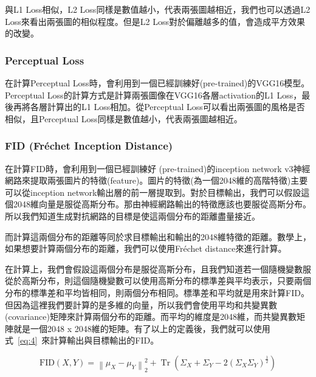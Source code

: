 \documentclass[a4paper, 12pt]{article}
\begin{document}
與L1 Loss相似，L2 Loss同樣是數值越小，代表兩張圖越相近，我們也可以透過L2 Loss來看出兩張圖的相似程度。但是L2 Loss對於偏離越多的值，會造成平方效果的改變。

\subsubsection{Perceptual Loss\cite{zhang2018perceptual}}

在計算Perceptual Loss時，會利用到一個已經訓練好(pre-trained)的VGG16模型。Perceptual Loss的計算方式是計算兩張圖像在VGG16各層activation的L1 Loss，最後再將各層計算出的L1 Loss相加。從Perceptual Loss可以看出兩張圖的風格是否相似，且Perceptual Loss同樣是數值越小，代表兩張圖越相近。

\subsubsection{FID (Fréchet Inception Distance)\cite{DOWSON1982450}}
在計算FID時，會利用到一個已經訓練好 (pre-trained)的inception network v3神經網路來提取兩張圖片的特徵(feature)。圖片的特徵(為一個2048維的高階特徵)主要可以從inception network輸出層的前一層提取到。對於目標輸出，我們可以假設這個2048維向量是服從高斯分布。那由神經網路輸出的特徵應該也要服從高斯分布。所以我們知道生成對抗網路的目標是使這兩個分布的距離盡量接近。

而計算這兩個分布的距離等同於求目標輸出和輸出的2048維特徵的距離。數學上，如果想要計算兩個分布的距離，我們可以使用Fréchet distance來進行計算。

在計算上，我們會假設這兩個分布是服從高斯分布，且我們知道若一個隨機變數服從於高斯分布，則這個隨機變數可以使用高斯分布的標準差與平均表示，只要兩個分布的標準差和平均皆相同，則兩個分布相同。標準差和平均就是用來計算FID。但因為這裡我們要計算的是多維的向量，所以我們會使用平均和共變異數(covariance)矩陣來計算兩個分布的距離。而平均的維度是2048維，而共變異數矩陣就是一個2048 x 2048維的矩陣。有了以上的定義後，我們就可以使用式~\ref{eq:4}~來計算輸出與目標輸出的FID。

\begin{equation}
\mathrm{FID}(X, Y)=\left\|\mu_{X}-\mu_{Y}\right\|_{2}^{2}+\operatorname{Tr}\left(\Sigma_{X}+\Sigma_{Y}-2\left(\Sigma_{X} \Sigma_{Y}\right)^{\frac{1}{2}}\right)
\label{eq:4}
\end{equation}
\end{document}
